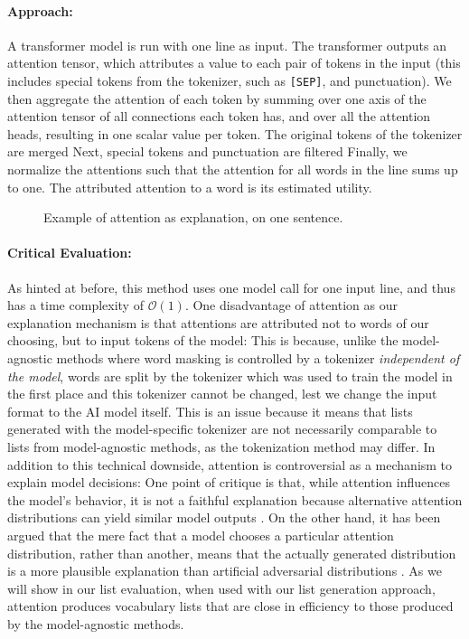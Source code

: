 \paragraph{Approach:}
A transformer model is run with one line as input.
The transformer outputs an attention tensor, which attributes a value to each pair of tokens in the input (this includes special tokens from the tokenizer, such as \texttt{[SEP]}, and punctuation).
We then aggregate the attention of each token by summing over one axis of the attention tensor of all connections each token has, and over all the attention heads, resulting in one scalar value per token.
The original tokens of the tokenizer are merged
Next, special tokens and punctuation are filtered
Finally, we normalize the attentions such that the attention for all words in the line sums up to one.
The attributed attention to a word is its estimated utility.

\begin{figure}[H]
	
	\caption{Example of attention as explanation, on one sentence.}
	\label{fig:attention}
\end{figure}

\paragraph{Critical Evaluation:}
As hinted at before, this method uses one model call for one input line, and thus has a time complexity of $\mathcal{O}(1)$.
One disadvantage of attention as our explanation mechanism is that attentions are attributed not to words of our choosing, but to input tokens of the model:
This is because, unlike the model-agnostic methods where word masking is controlled by a tokenizer \textit{independent of the model}, words are split by the tokenizer which was used to train the model in the first place and this tokenizer cannot be changed, lest we change the input format to the AI model itself.
This is an issue because it means that lists generated with the model-specific tokenizer are not necessarily comparable to lists from model-agnostic methods, as the tokenization method may differ.
In addition to this technical downside, attention is controversial as a mechanism to explain model decisions:
One point of critique is that, while attention influences the model's behavior, it is not a faithful explanation because alternative attention distributions can yield similar model outputs \cite{jainAttentionNotExplanation2019}.
On the other hand, it has been argued that the mere fact that a model chooses a particular attention distribution, rather than another, means that the actually generated distribution is a more plausible explanation than artificial adversarial distributions \cite{wiegreffeAttentionNotNot2019}.
As we will show in our list evaluation, when used with our list generation approach, attention produces vocabulary lists that are close in efficiency to those produced by the model-agnostic methods.

